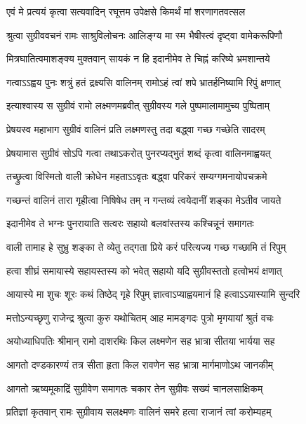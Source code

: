 \twolineshloka
{एवं मे प्रत्ययं कृत्वा सत्यवादिन् रघूत्तम}
{उपेक्षसे किमर्थं मां शरणागतवत्सल} %

\twolineshloka
{श्रुत्वा सुग्रीववचनं रामः साश्रुविलोचनः}
{आलिङ्ग्य मा स्म भैषीस्त्वं दृष्ट्वा वामेकरूपिणौ} %

\twolineshloka
{मित्रघातित्वमाशङ्क्य मुक्तवान् सायकं न हि}
{इदानीमेव ते चिह्नं करिष्ये भ्रमशान्तये} %

\twolineshloka
{गत्वाऽऽह्वय पुनः शत्रुं हतं द्रक्ष्यसि वालिनम्}
{रामोऽहं त्वां शपे भ्रातर्हनिष्यामि रिपुं क्षणात्} %

\twolineshloka
{इत्याश्वास्य स सुग्रीवं रामो लक्ष्मणमब्रवीत्}
{सुग्रीवस्य गले पुष्पमालामामुच्य पुष्पिताम्} %

\twolineshloka
{प्रेषयस्व महाभाग सुग्रीवं वालिनं प्रति}
{लक्ष्मणस्तु तदा बद्ध्वा गच्छ गच्छेति सादरम्} %

\twolineshloka
{प्रेषयामास सुग्रीवं सोऽपि गत्वा तथाऽकरोत्}
{पुनरप्यद्भुतं शब्दं कृत्वा वालिनमाह्वयत्} %

\twolineshloka
{तच्छ्रुत्वा विस्मितो वाली क्रोधेन महताऽऽवृतः}
{बद्ध्वा परिकरं सम्यग्गमनायोपचक्रमे} %

\twolineshloka
{गच्छन्तं वालिनं तारा गृहीत्वा निषिषेध तम्}
{न गन्तव्यं त्वयेदानीं शङ्का मेऽतीव जायते} %

\twolineshloka
{इदानीमेव ते भग्नः पुनरायाति सत्वरः}
{सहायो बलवांस्तस्य कश्चिन्नूनं समागतः} %

\twolineshloka
{वाली तामाह हे सुभ्रु शङ्का ते व्येतु तद्गता}
{प्रिये करं परित्यज्य गच्छ गच्छामि तं रिपुम्} %

\twolineshloka
{हत्वा शीघ्रं समायास्ये सहायस्तस्य को भवेत्}
{सहायो यदि सुग्रीवस्ततो हत्वोभयं क्षणात्} %

\twolineshloka
{आयास्ये मा शुचः शूरः कथं तिष्ठेद् गृहे रिपुम्}
{ज्ञात्वाऽप्याह्वयमानं हि हत्वाऽऽयास्यामि सुन्दरि} %


\twolineshloka
{मत्तोऽन्यच्छृणु राजेन्द्र श्रुत्वा कुरु यथोचितम्}
{आह मामङ्गदः पुत्रो मृगयायां श्रुतं वचः} %

\twolineshloka
{अयोध्याधिपतिः श्रीमान् रामो दाशरथिः किल}
{लक्ष्मणेन सह भ्रात्रा सीतया भार्यया सह} %

\twolineshloka
{आगतो दण्डकारण्यं तत्र सीता हृता किल}
{रावणेन सह भ्रात्रा मार्गमाणोऽथ जानकीम्} %

\twolineshloka
{आगतो ऋष्यमूकाद्रिं सुग्रीवेण समागतः}
{चकार तेन सुग्रीवः सख्यं चानलसाक्षिकम्} %

\twolineshloka
{प्रतिज्ञां कृतवान् रामः सुग्रीवाय सलक्ष्मणः}
{वालिनं समरे हत्वा राजानं त्वां करोम्यहम्} %

